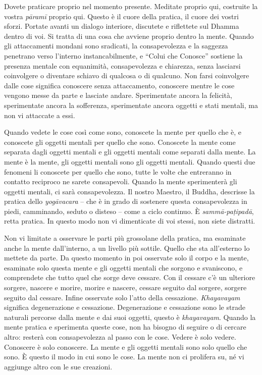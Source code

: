 Dovete praticare proprio nel momento presente. Meditate proprio qui,
costruite la vostra \emph{pāramī} proprio qui. Questo è il cuore della
pratica, il cuore dei vostri sforzi. Portate avanti un dialogo
interiore, discutete e riflettete sul Dhamma dentro di voi. Si tratta di
una cosa che avviene proprio dentro la mente. Quando gli attaccamenti
mondani sono sradicati, la consapevolezza e la saggezza penetrano verso
l'interno instancabilmente, e ``Colui che Conosce'' sostiene la presenza
mentale con equanimità, consapevolezza e chiarezza, senza lasciarsi
coinvolgere o diventare schiavo di qualcosa o di qualcuno. Non farsi
coinvolgere dalle cose significa conoscere senza attaccamento, conoscere
mentre le cose vengono messe da parte e lasciate andare. Sperimentate
ancora la felicità, sperimentate ancora la sofferenza, sperimentate
ancora oggetti e stati mentali, ma non vi attaccate a essi.

Quando vedete le cose così come sono, conoscete la mente per quello che
è, e conoscete gli oggetti mentali per quello che sono. Conoscete la
mente come separata dagli oggetti mentali e gli oggetti mentali come
separati dalla mente. La mente è la mente, gli oggetti mentali sono gli
oggetti mentali. Quando questi due fenomeni li conoscete per quello che
sono, tutte le volte che entreranno in contatto reciproco ne sarete
consapevoli. Quando la mente sperimenterà gli oggetti mentali, ci sarà
consapevolezza. Il nostro Maestro, il Buddha, descrisse la pratica dello
\emph{yogāvacara} -- che è in grado di sostenere questa consapevolezza
in piedi, camminando, seduto o disteso -- come a ciclo continuo. È
\emph{sammā-paṭipadā}, retta pratica. In questo modo non vi dimenticate
di voi stessi, non siete distratti.

Non vi limitate a osservare le parti più grossolane della pratica, ma
esaminate anche la mente dall'interno, a un livello più sottile. Quello
che sta all'esterno lo mettete da parte. Da questo momento in poi
osservate solo il corpo e la mente, esaminate solo questa mente e gli
oggetti mentali che sorgono e svaniscono, e comprendete che tutto quel
che sorge deve cessare. Con il cessare c'è un ulteriore sorgere, nascere
e morire, morire e nascere, cessare seguito dal sorgere, sorgere seguito
dal cessare. Infine osservate solo l'atto della cessazione.
\emph{Khayavayam} significa degenerazione e cessazione. Degenerazione e
cessazione sono le strade naturali percorse dalla mente e dai suoi
oggetti, questo è \emph{khayavayam}. Quando la mente pratica e
sperimenta queste cose, non ha bisogno di seguire o di cercare altro:
resterà con consapevolezza al passo con le cose. Vedere è solo vedere.
Conoscere è solo conoscere. La mente e gli oggetti mentali sono solo
quello che sono. È questo il modo in cui sono le cose. La mente non ci
prolifera su, né vi aggiunge altro con le sue creazioni.

